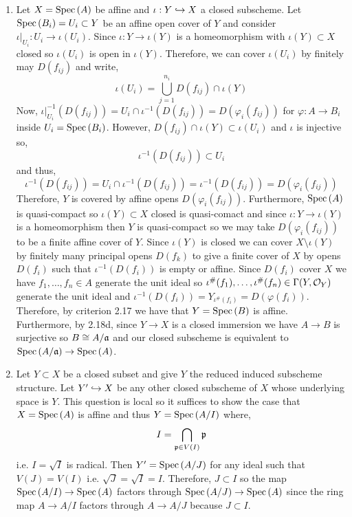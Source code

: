 \documentclass[12pt]{article}
\begin{document}
\begin{enumerate}
\item Let $X = \mathrm{Spec}\left( A \right)$ be affine and $\iota : Y \hookrightarrow X$ a closed subscheme. Let $\mathrm{Spec}\left( B_i \right) = U_i \subset Y$ be an affine open cover of $Y$ and consider $\iota|_{U_i} : U_i \to \iota(U_i)$. Since $\iota : Y \to \iota(Y)$ is a homeomorphism with $\iota(Y) \subset X$ closed so $\iota(U_i)$ is open in $\iota(Y)$. Therefore, we can cover $\iota(U_i)$ by finitely may $D(f_{ij})$ and write,
\[ \iota(U_i) = \bigcup_{j = 1}^{n_i} D(f_{ij}) \cap \iota(Y) \]
Now, $\iota|_{U_i}^{-1}(D(f_{ij})) = U_i \cap \iota^{-1}(D(f_{ij})) = D(\varphi_i(f_{ij}))$ for $\varphi : A \to B_i$ inside $U_i = \mathrm{Spec}\left( B_i \right)$. However, $D(f_{ij}) \cap \iota(Y) \subset \iota(U_i)$ and $\iota$ is injective so,
\[ \iota^{-1}(D(f_{ij})) \subset U_i \]
and thus,
\[ \iota^{-1}(D(f_{ij})) = U_i \cap \iota^{-1}(D(f_{ij})) = \iota^{-1}(D(f_{ij})) = D(\varphi_i(f_{ij})) \]
Therefore, $Y$ is covered by affine opens $D(\varphi_i(f_{ij}))$. Furthermore, $\mathrm{Spec}\left( A \right)$ is quasi-compact so $\iota(Y) \subset X$ closed is quasi-comact and since $\iota : Y \to \iota(Y)$ is a homeomorphism then $Y$ is quasi-compact so we may take $D(\varphi_i(f_{ij}))$ to be a finite affine cover of $Y$. Since $\iota(Y)$ is closed we can cover $X \setminus \iota(Y)$ by finitely many principal opens $D(f_k)$ to give a finite cover of $X$ by opens $D(f_i)$ such that $\iota^{-1}(D(f_i))$ is empty or affine. Since $D(f_i)$ cover $X$ we have $f_1, \dots, f_n \in A$ generate the unit ideal so $\iota^\#(f_1), \dots, \iota^\#(f_n) \in \Gamma(Y, \mathcal{O}_{Y})$ generate the unit ideal and $\iota^{-1}(D(f_i)) = Y_{\iota^\#(f_i)} = D(\varphi(f_i))$. Therefore, by criterion 2.17 we have that $Y = \mathrm{Spec}\left( B \right)$ is affine. Furthermore, by 2.18d, since $Y \to X$ is a closed immersion we have $A \to B$ is surjective so $B \cong A / \mathfrak{a}$ and our closed subscheme is equivalent to $\mathrm{Spec}\left( A / \mathfrak{a} \right) \to \mathrm{Spec}\left( A \right)$.  

\item Let $Y \subset X$ be a closed subset and give $Y$ the reduced induced subscheme structure. Let $Y' \hookrightarrow X$ be any other closed subscheme of $X$ whose underlying space is $Y$. This question is local so it suffices to show the case that $X = \mathrm{Spec}\left( A \right)$ is affine and thus $Y = \mathrm{Spec}\left( A / I \right)$ where,
\[ I = \bigcap_{\mathfrak{p} \in V(I)} \mathfrak{p} \]
i.e. $I = \sqrt{I}$ is radical. Then $Y' = \mathrm{Spec}\left( A / J \right)$ for any ideal such that $V(J) = V(I)$ i.e. $\sqrt{J} = \sqrt{I} = I$. Therefore, $J \subset I$ so  the map $\mathrm{Spec}\left( A / I \right) \to \mathrm{Spec}\left( A \right)$ factors through $\mathrm{Spec}\left( A/J \right) \to \mathrm{Spec}\left( A \right)$ since the ring map $A \to A / I$ factors through $A \to A / J$ because $J \subset I$.  


\end{enumerate}
\end{document}

